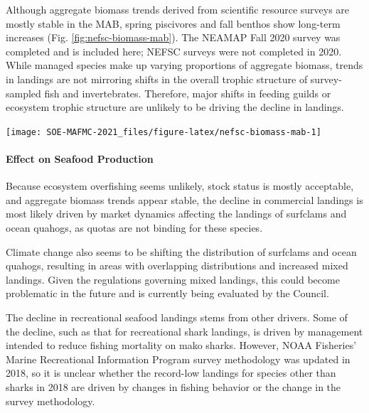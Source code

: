 \documentclass[
  10pt,
]{article}
\let\origfigure\figure
\let\endorigfigure\endfigure
\renewenvironment{figure}[1][2] {
    \expandafter\origfigure\expandafter[H]
} {
    \endorigfigure
}
\begin{document}
Although aggregate biomass trends derived from scientific resource
surveys are mostly stable in the MAB, spring piscivores and fall benthos
show long-term increases (Fig. \ref{fig:nefsc-biomass-mab}). The NEAMAP
Fall 2020 survey was completed and is included here; NEFSC surveys were
not completed in 2020. While managed species make up varying proportions
of aggregate biomass, trends in landings are not mirroring shifts in the
overall trophic structure of survey-sampled fish and invertebrates.
Therefore, major shifts in feeding guilds or ecosystem trophic structure
are unlikely to be driving the decline in landings.

\begin{figure}

{\centering \texttt{[image: SOE-MAFMC-2021\_files/figure-latex/nefsc-biomass-mab-1]} 

}

\caption{Spring (left) and fall (right) surveyed biomass in the Mid-Atlantic Bight. Data from the NEFSC Bottom Trawl Survey are shown in black, with NEAMAP shown in red. The shaded area around each annual mean represents 2 standard deviations from the mean.}\label{fig:nefsc-biomass-mab}
\end{figure}

\hypertarget{effect-on-seafood-production}{%
\paragraph{Effect on Seafood
Production}\label{effect-on-seafood-production}}

Because ecosystem overfishing seems unlikely, stock status is mostly
acceptable, and aggregate biomass trends appear stable, the decline in
commercial landings is most likely driven by market dynamics affecting
the landings of surfclams and ocean quahogs, as quotas are not binding
for these species.

Climate change also seems to be shifting the distribution of surfclams
and ocean quahogs, resulting in areas with overlapping distributions and
increased mixed landings. Given the regulations governing mixed
landings, this could become problematic in the future and is currently
being evaluated by the Council.

The decline in recreational seafood landings stems from other drivers.
Some of the decline, such as that for recreational shark landings, is
driven by management intended to reduce fishing mortality on mako
sharks. However, NOAA Fisheries' Marine Recreational Information Program
survey methodology was updated in 2018, so it is unclear whether the
record-low landings for species other than sharks in 2018 are driven by
changes in fishing behavior or the change in the survey methodology.
\end{document}
